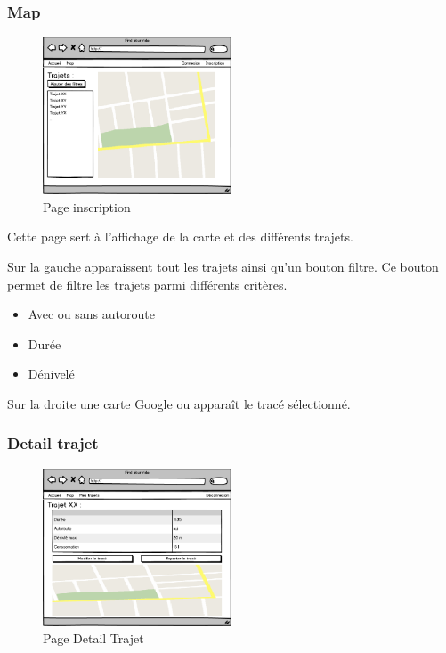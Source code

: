 \documentclass[a4paper]{article}
\begin{document}
\subsubsection{Map}
\begin{figure}[h]
\centering
\includegraphics[width=0.5\textwidth]{./Images/Interfaces/Map.png}
\caption{Page inscription}
\end{figure}

Cette page sert à l'affichage de la carte et des différents trajets.

Sur la gauche apparaissent tout les trajets ainsi qu'un bouton filtre.
Ce bouton permet de filtre les trajets parmi différents critères.
\begin{itemize}
    \item Avec ou sans autoroute
    \item Durée
    \item Dénivelé
\end{itemize}
Sur la droite une carte Google ou apparaît le tracé sélectionné.

\subsubsection{Detail trajet}
\begin{figure}[h]
\centering
\includegraphics[width=0.5\textwidth]{./Images/Interfaces/DetailTrajet.png}
\caption{Page Detail Trajet}
\end{figure}
\end{document}
